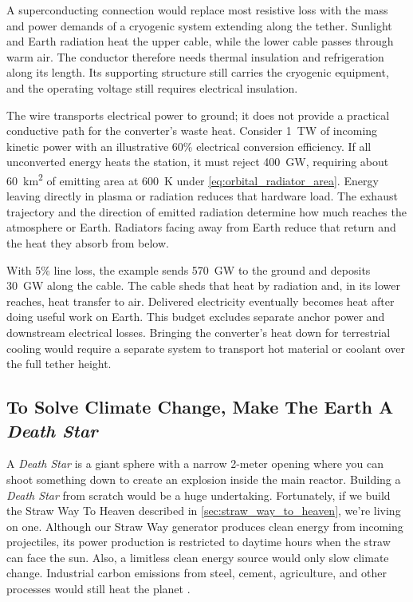 \documentclass{article}
\begin{document}
A superconducting connection would replace most resistive loss with the mass and power demands of a cryogenic system extending along the tether. Sunlight and Earth radiation heat the upper cable, while the lower cable passes through warm air. The conductor therefore needs thermal insulation and refrigeration along its length. Its supporting structure still carries the cryogenic equipment, and the operating voltage still requires electrical insulation.

The wire transports electrical power to ground; it does not provide a practical conductive path for the converter's waste heat. Consider \SI{1}{\tera\watt} of incoming kinetic power with an illustrative 60\% electrical conversion efficiency. If all unconverted energy heats the station, it must reject \SI{400}{\giga\watt}, requiring about \SI{60}{\kilo\meter\squared} of emitting area at \SI{600}{\kelvin} under \autoref{eq:orbital_radiator_area}. Energy leaving directly in plasma or radiation reduces that hardware load. The exhaust trajectory and the direction of emitted radiation determine how much reaches the atmosphere or Earth. Radiators facing away from Earth reduce that return and the heat they absorb from below.

With 5\% line loss, the example sends \SI{570}{\giga\watt} to the ground and deposits \SI{30}{\giga\watt} along the cable. The cable sheds that heat by radiation and, in its lower reaches, heat transfer to air. Delivered electricity eventually becomes heat after doing useful work on Earth. This budget excludes separate anchor power and downstream electrical losses. Bringing the converter's heat down for terrestrial cooling would require a separate system to transport hot material or coolant over the full tether height.

\subsection{To Solve Climate Change, Make The Earth A \textit{Death Star}}\label{sec:death_star}
A \textit{Death Star} \cite{death_star} is a giant sphere with a narrow 2-meter opening where you can shoot something down to create an explosion inside the main reactor.   Building a \textit{Death Star} from scratch  would be a huge undertaking.   Fortunately, if we build the Straw Way To Heaven described in \autoref{sec:straw_way_to_heaven}, we're living on one.  Although our Straw Way generator produces clean energy from incoming projectiles, its power production is restricted to daytime hours when the straw can face the sun.   Also, a limitless clean energy source would only slow climate change.   Industrial carbon emissions from steel, cement, agriculture, and other processes would still heat the planet \cite{steel_and_cement}.   
\end{document}

